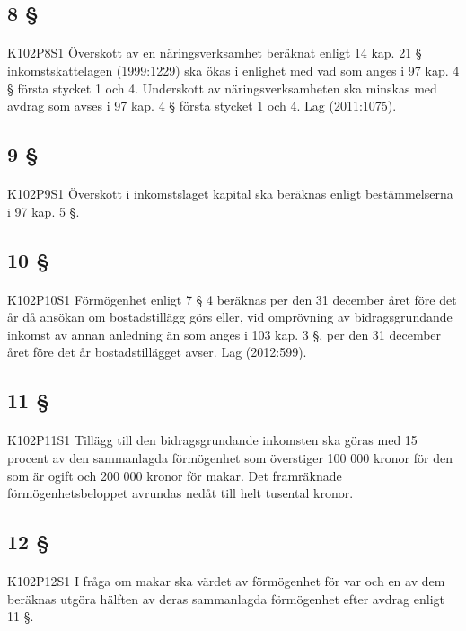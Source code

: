 \documentclass[a4paper,notitlepage,openany,10pt]{book}
\begin{document}
\subsection*{8 §}
\paragraph*{}
{\tiny K102P8S1}
Överskott av en näringsverksamhet beräknat enligt 14 kap. 21 § inkomstskattelagen (1999:1229) ska ökas i enlighet med vad som anges i 97 kap. 4 § första stycket 1 och 4. Underskott av näringsverksamheten ska minskas med avdrag som avses i 97 kap. 4 § första stycket 1 och 4.
Lag (2011:1075).
\subsection*{9 §}
\paragraph*{}
{\tiny K102P9S1}
Överskott i inkomstslaget kapital ska beräknas enligt bestämmelserna i 97 kap. 5 §.
\subsection*{10 §}
\paragraph*{}
{\tiny K102P10S1}
Förmögenhet enligt 7 § 4 beräknas per den 31 december året före det år då ansökan om bostadstillägg görs eller, vid omprövning av bidragsgrundande inkomst av annan anledning än som anges i 103 kap. 3 §, per den 31 december året före det år bostadstillägget avser.
Lag (2012:599).
\subsection*{11 §}
\paragraph*{}
{\tiny K102P11S1}
Tillägg till den bidragsgrundande inkomsten ska göras med 15 procent av den sammanlagda förmögenhet som överstiger 100 000 kronor för den som är ogift och 200 000 kronor för makar. Det framräknade förmögenhetsbeloppet avrundas nedåt till helt tusental kronor.
\subsection*{12 §}
\paragraph*{}
{\tiny K102P12S1}
I fråga om makar ska värdet av förmögenhet för var och en av dem beräknas utgöra hälften av deras sammanlagda förmögenhet efter avdrag enligt 11 §.
\end{document}
